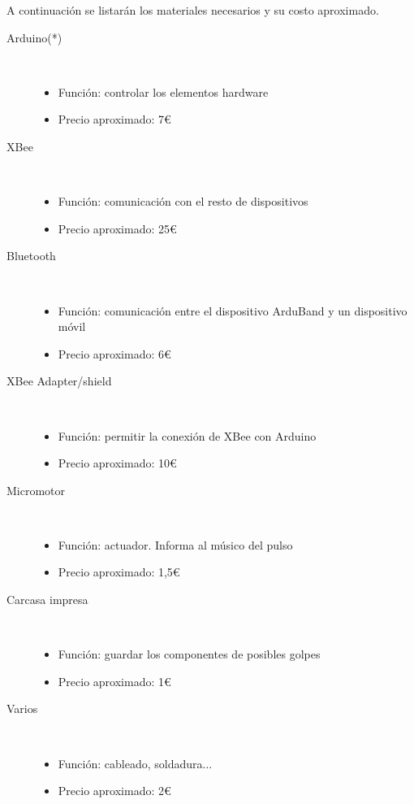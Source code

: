 A continuación se listarán los materiales necesarios y su costo aproximado.
  \begin{description}
    \item [Arduino(*)]\hfill \\
      \begin{itemize}
        \item {Función: controlar los elementos hardware}
        \item {Precio aproximado: 7\euro}
      \end{itemize}
    \item [XBee]\hfill \\
      \begin{itemize}
        \item {Función: comunicación con el resto de dispositivos}
        \item {Precio aproximado: 25\euro}
      \end{itemize}
      \item [Bluetooth]\hfill \\
        \begin{itemize}
          \item {Función: comunicación entre el dispositivo ArduBand y un dispositivo móvil}
          \item {Precio aproximado: 6\euro}
        \end{itemize}
      \item [XBee Adapter/shield]\hfill \\
        \begin{itemize}
          \item {Función: permitir la conexión de XBee con Arduino}
          \item {Precio aproximado: 10\euro}
        \end{itemize}
      \item [Micromotor]\hfill \\
        \begin{itemize}
          \item {Función: actuador. Informa al músico del pulso}
          \item {Precio aproximado: 1,5\euro}
        \end{itemize}
      \item [Carcasa impresa]\hfill \\
          \begin{itemize}
            \item {Función: guardar los componentes de posibles golpes}
            \item {Precio aproximado: 1\euro}
        \end{itemize}
      \item [Varios]\hfill \\
        \begin{itemize}
          \item {Función: cableado, soldadura...}
          \item {Precio aproximado: 2\euro}
        \end{itemize}
  \end{description}


